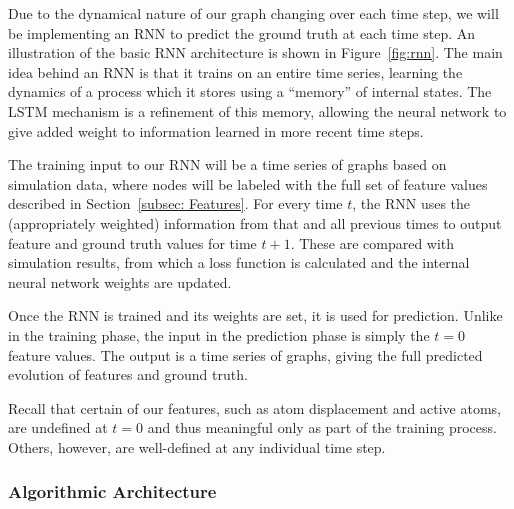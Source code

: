 Due to the dynamical nature of our graph changing over each time step, we will be implementing an RNN to predict the ground truth at each time step. An illustration of the basic RNN architecture is shown in Figure~\ref{fig:rnn}.  The main idea behind an RNN is that it trains on an entire time series, learning the dynamics of a process which it stores using a ``memory'' of internal states.  The LSTM mechanism is a refinement of this memory, allowing the neural network to give added weight to information learned in more recent time steps.

The training input to our RNN will be a time series of graphs based on simulation data, where nodes will be labeled with the full set of feature values described in Section~\ref{subsec: Features}.  For every time $t$, the RNN uses the (appropriately weighted) information from that and all previous times to output feature and ground truth values for time $t+1$.  These are compared with simulation results, from which a loss function is calculated and the internal neural network weights are updated.

Once the RNN is trained and its weights are set, it is used for prediction.  Unlike in the training phase, the input in the prediction phase is simply the $t=0$ feature values.  The output is a time series of graphs, giving the full predicted evolution of features and ground truth.

Recall that certain of our features, such as atom displacement and active atoms, are undefined at $t=0$ and thus meaningful only as part of the training process.  Others, however, are well-defined at any individual time step.



\subsubsection{Algorithmic Architecture}

